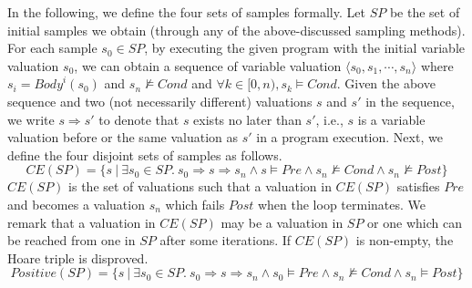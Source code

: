 \noindent
In the following, we define the four sets of samples formally. Let $\mathit{SP}$ be the set of initial samples we obtain (through any of the above-discussed sampling methods). For each sample $s_0 \in \mathit{SP}$, by executing the given program with the initial variable valuation $s_0$, we can obtain a sequence of variable valuation $\langle s_0, s_1, \cdots, s_n \rangle$ where $s_i = \mathit{Body}^i(s_0)$ and $s_n \not \models \mathit{Cond}$ and $\forall k \in [0, n), s_k \models \mathit{Cond}$. Given the above sequence and two (not necessarily different) valuations $s$ and $s'$ in the sequence, we write $s \Rightarrow s'$ to denote that $s$ exists no later than $s'$, i.e., $s$ is a variable valuation before or the same valuation as $s'$ in a program execution.
Next, we define the four disjoint sets of samples as follows.
\[
\mathit{CE}(\mathit{SP}) = \{s~|~\exists s_0 \in \mathit{SP}.~s_0 \Rightarrow s \Rightarrow s_n \land s \models \mathit{Pre} \land s_n \not \models \mathit{Cond} \land s_n \not \models \mathit{Post}\} \]
$\mathit{CE(SP)}$ is the set of valuations such that a valuation in $\mathit{CE(SP)}$ satisfies $\mathit{Pre}$ and becomes a valuation $s_n$ which fails $\mathit{Post}$ when the loop terminates. We remark that a valuation in $\mathit{CE(SP)}$ may be a valuation in $\mathit{SP}$ or one which can be reached from one in $\mathit{SP}$ after some iterations. If $\mathit{CE}(\mathit{SP})$ is non-empty, the Hoare triple is disproved.
\[
\mathit{Positive}(\mathit{SP}) = \{s~|~\exists s_0 \in \mathit{SP}.~s_0 \Rightarrow s \Rightarrow s_n \land s_0 \models \mathit{Pre} \land s_n \not \models \mathit{Cond} \land s_n \models \mathit{Post}\}\]
